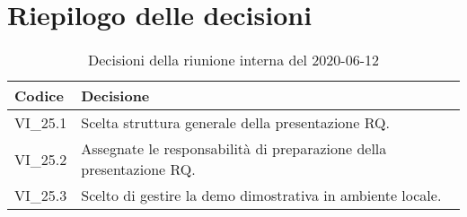 \section{Riepilogo delle decisioni}
\begin{longtable}{
	 >{\centering}p{} >{}p{} }

	\caption{Decisioni della riunione interna del 2020-06-12}\\

	\textbf{\color{white}Codice} &
	\textbf{\color{white}Decisione}
	\tabularnewline
	\endhead

	VI\_25.1 & Scelta struttura generale della presentazione RQ. \\
	VI\_25.2 & Assegnate le responsabilità di preparazione della presentazione RQ. \\
	VI\_25.3 & Scelto di gestire la demo dimostrativa in ambiente\ped{\textit{G}} locale. \\
\end{longtable}
